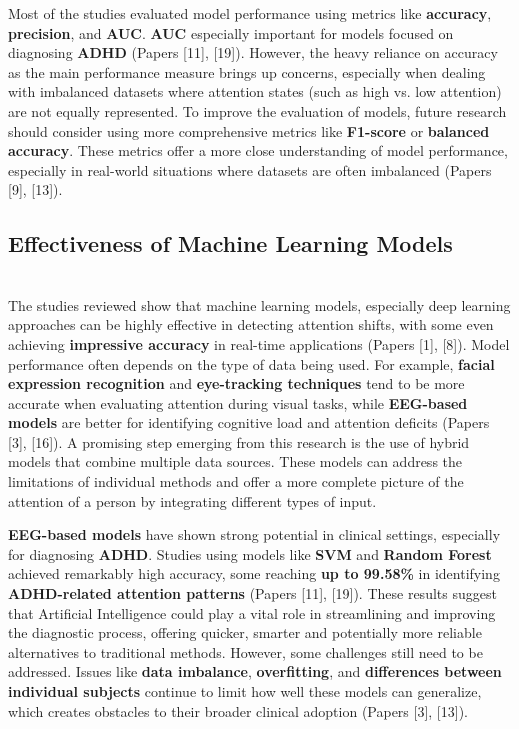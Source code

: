 \documentclass[12pt]{article}
\newcommand{\pct}{\%}
\begin{document}
Most of the studies evaluated model performance using metrics like \textbf{accuracy}, \textbf{precision}, and \textbf{AUC}. \textbf{AUC} especially important for models focused on diagnosing \textbf{ADHD} (Papers [11], [19]). However, the heavy reliance on accuracy as the main performance measure brings up concerns, especially when dealing with imbalanced datasets where attention states (such as high vs. low attention) are not equally represented. To improve the evaluation of models, future research should consider using more comprehensive metrics like \textbf{F1-score} or \textbf{balanced accuracy}. These metrics offer a more close understanding of model performance, especially in real-world situations where datasets are often imbalanced (Papers [9], [13]).

\subsection{ Effectiveness of Machine Learning Models} \\

The studies reviewed show that machine learning models, especially deep learning approaches can be highly effective in detecting attention shifts, with some even achieving \textbf{impressive accuracy} in real-time applications (Papers [1], [8]). Model performance often depends on the type of data being used. For example, \textbf{facial expression recognition} and \textbf{eye-tracking techniques} tend to be more accurate when evaluating attention during visual tasks, while \textbf{EEG-based models} are better for identifying cognitive load and attention deficits (Papers [3], [16]). A promising step emerging from this research is the use of hybrid models that combine multiple data sources. These models can address the limitations of individual methods and offer a more complete picture of the attention of a person by integrating different types of input.

\textbf{EEG-based models} have shown strong potential in clinical settings, especially for diagnosing \textbf{ADHD}. Studies using models like \textbf{SVM} and \textbf{Random Forest} achieved remarkably high accuracy, some reaching \textbf{up to 99.58\pct} in identifying \textbf{ADHD-related attention patterns} (Papers [11], [19]). These results suggest that Artificial Intelligence could play a vital role in streamlining and improving the diagnostic process, offering quicker, smarter and potentially more reliable alternatives to traditional methods. However, some challenges still need to be addressed. Issues like \textbf{data imbalance}, \textbf{overfitting}, and \textbf{differences between individual subjects} continue to limit how well these models can generalize, which creates obstacles to their broader clinical adoption (Papers [3], [13]).
\end{document}
